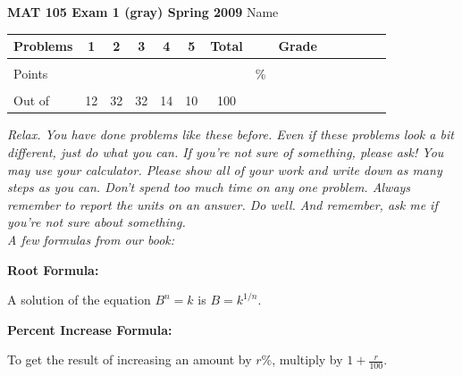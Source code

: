 \documentclass[12pt]{article}
\begin{document}
\textbf{MAT 105 Exam 1 (gray) Spring 2009} \hspace{.4in} {\large Name} \hrulefill

\begin{center}

\begin{tabular}
{|l|c|c|c|c|c|c|c|c|c|c|c|c|c|} \hline

 Problems & \hspace{5 pt} 1 \hspace{5 pt}  & \hspace{5 pt} 2 \hspace{5 pt} & \hspace{5 pt} 3 \hspace{5 pt} & \hspace{5 pt} 4 \hspace{5 pt} & \hspace{5 pt} 5 \hspace{5 pt} & \hspace{5 pt} Total  \hspace{5 pt} & &  \hspace{5 pt} Grade \hspace{5 pt}  \\ \hline
&&&&&&&&\\  
Points &&&&&&&    \hspace{.8in}\% &  \\ 
&&&&&&&& \\  \hline
Out of & 12 & 32 & 32 & 14 & 10 &100 & & \\ \hline

\end {tabular}

\end{center}

\vspace{.2in}

 \emph{Relax.  You have done problems like these before.  Even if these problems look a bit different, just do what you can.  If you're not sure of something, please ask! You may use your calculator.  Please show all of your work and write down as many steps as you can.  Don't spend too much time on any one problem.  Always remember to report the units on an answer. Do well.  And remember, ask me if you're not sure about something.}\\

\vspace{.5in} 
\noindent \emph{A few formulas from our book:}

\begin{center}

\textbf{Root Formula:} 

A solution of the equation $B^n=k$ is $B=k^{1/n}$.

\vspace{.2in} 

\textbf{Percent Increase Formula:} 

To get the result of increasing an amount by $r$\%, multiply by $1 + \frac{r}{100}$.

\end{center}
\end{document}
